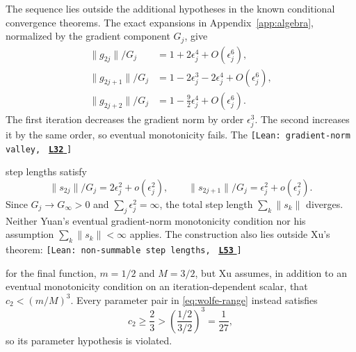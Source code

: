 \documentclass[11pt]{article}
\newcommand{\norm}[1]{\lVert #1\rVert}
\newcommand{\leanLinkText}[1]{%
  \underline{\textbf{#1}}%
}
\newcommand{\leanSnapshot}{e308927f5b7930bdd002f0c0e42b9d112ad821cb}
\newcommand{\leanClaimTag}[3]{%
  {\footnotesize\texttt{[Lean: #1, }}%
  \href{https://github.com/imathwy/DFP_wolfe_local/blob/\leanSnapshot/#2?plain=1\#L#3}%
    {\leanLinkText{\footnotesize\texttt{L#3}}}%
  {\footnotesize\texttt{]}}\enspace
}
\begin{document}
The sequence lies outside the additional hypotheses in the known conditional
convergence theorems.  The exact expansions in
Appendix~\ref{app:algebra}, normalized by the gradient component $G_j$, give
\begin{align*}
\norm{g_{2j}}/G_j
 &=1+2\epsilon_j^4+O(\epsilon_j^6),\\
\norm{g_{2j+1}}/G_j
 &=1-2\epsilon_j^3-2\epsilon_j^4+O(\epsilon_j^6),\\
\norm{g_{2j+2}}/G_j
 &=1-\frac92\epsilon_j^4+O(\epsilon_j^6).
\end{align*}
The first iteration decreases the gradient norm by order $\epsilon_j^3$.  The
second increases it by the same order, so eventual monotonicity fails.  The
\leanClaimTag{gradient-norm valley}{DFPWolfe/A_uniformly_convex_counterexample_to_global_convergence_of_DFP_under_weak_Wolfe_/Remark_6_8_Gradient_norms_are_not_eventually_monotone.lean}{32}
step lengths satisfy
\[
\norm{s_{2j}}/G_j=2\epsilon_j^2+o(\epsilon_j^2),
\qquad
\norm{s_{2j+1}}/G_j=\epsilon_j^2+o(\epsilon_j^2).
\]
Since $G_j\to G_\infty>0$ and $\sum_j\epsilon_j^2=\infty$, the total step
length $\sum_k\norm{s_k}$ diverges.  Neither Yuan's eventual gradient-norm
monotonicity condition nor his assumption $\sum_k\norm{s_k}<\infty$
\cite{Yuan1995} applies.  The construction also lies outside Xu's theorem:
\leanClaimTag{non-summable step lengths}{DFPWolfe/A_uniformly_convex_counterexample_to_global_convergence_of_DFP_under_weak_Wolfe_/Remark_6_9_The_total_step_length_diverges.lean}{53}
for the final function, $m=1/2$ and $M=3/2$, but Xu
\cite{Xu1997} assumes, in addition to an eventual monotonicity condition on an
iteration-dependent scalar, that $c_2<(m/M)^3$.  Every parameter pair in
\eqref{eq:wolfe-range} instead satisfies
\[
c_2\ge\frac23>
\left(\frac{1/2}{3/2}\right)^3=\frac1{27},
\]
so its parameter hypothesis is violated.
\end{document}
